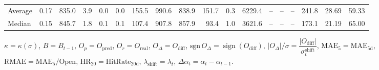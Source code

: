 \begin{threeparttable}
{\begin{tabular}{lrrrrrrrrrrrrrrrrr}
Average &     0.17 & 835.0 &               3.9 &               0.0 &                0.0 &              155.5 &  990.6 & 838.9 &      151.7 &                      0.3 &              6229.4 &         -- &        -- &             -- &            241.8 &           28.69 &                  59.33 \\
 Median &     0.15 & 845.7 &               1.8 &               0.1 &                0.1 &              107.4 &  907.8 & 857.9 &       93.4 &                      1.0 &              3621.6 &         -- &        -- &             -- &            173.1 &           21.19 &                  65.00 \\
\bottomrule
\end{tabular}
}
\begin{tablenotes}\footnotesize
\item $\kappa=\kappa(\sigma)$, $B=B_{t-1}$, $O_p=O_{\text{pred}}$, $O_r=O_{\text{real}}$, $O_\Delta=O_{\text{diff}}$, $\mathrm{sgn}\,O_\Delta=\operatorname{sign}(O_{\text{diff}})$, $|O_\Delta|/\sigma=\dfrac{|O_{\text{diff}}|}{\sigma_t^{\text{shift}}}$, $\mathrm{MAE}_5=\mathrm{MAE}_{5\text{d}}$, $\mathrm{RMAE}= \mathrm{MAE}_5 / \text{Open}$, $\mathrm{HR}_{20}=\mathrm{HitRate}_{20\text{d}}$, 
$\lambda_{\text{shift}}=\lambda_t$, 
$\Delta\alpha_t=\alpha_t-\alpha_{t-1}$.
\end{tablenotes}
\end{threeparttable}
\endgroup

